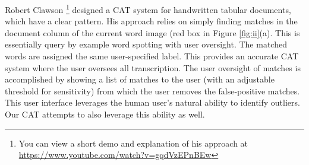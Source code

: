 \documentclass[ms,electronic,twosidetoc,letterpaper,chaptercenter,parttop,lol,lof,lot]{byumsphd}
\begin{document}
Robert Clawson \cite{Clawson2014}\footnote{You can view a short demo and explanation of his approach at \url{https://www.youtube.com/watch?v=gqdVzEPnBEw}} designed a CAT system for handwritten tabular documents, which have a clear pattern. His approach relies on simply finding matches in the document column of the current word image (red box in Figure \ref{fig:ii}(a). This is essentially query by example word spotting with user oversight. The matched words are assigned the same user-specified label. This provides an accurate CAT system where the user oversees all transcription. The user oversight of matches is accomplished by showing a list of matches to the user (with an adjustable threshold for sensitivity) from which the user removes the false-positive matches. This user interface leverages the human user's natural ability to identify outliers.
Our CAT attempts to also leverage this ability as well.
\end{document}
